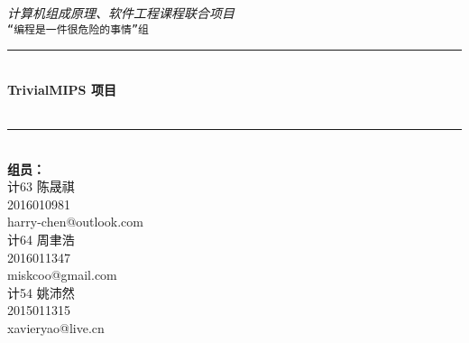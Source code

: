 \begin{titlepage}

    \newcommand{\HRule}{\rule{\linewidth}{0.5mm}}
  
    \vfill
    \center 
    
    \textit{\Large 计算机组成原理、软件工程课程联合项目}\\[0.5cm] 
    \texttt{\Large “编程是一件很危险的事情”组}
  
  
    \vspace{1.5 cm}
    \HRule \\[0.4cm]
    { \huge \bfseries TrivialMIPS 项目}\\[0.4cm]
    { \huge \bfseries \artname}\\
    \HRule \\[1.5cm]
   
  
    {\Large\textbf{组员：}}\\
    \vspace{.5 cm}
    计63 陈晟祺\\
    2016010981\\
    harry-chen@outlook.com\\
    \vspace{.5 cm}
    计64 周聿浩\\
    2016011347\\
    miskcoo@gmail.com\\
    \vspace{.5 cm}
    计54 姚沛然\\
    2015011315\\
    xavieryao@live.cn\\
  
    \vspace{1.5 cm}
    {\large \artdate}\\[3cm] 
  
  
  \vfill
  
\end{titlepage}